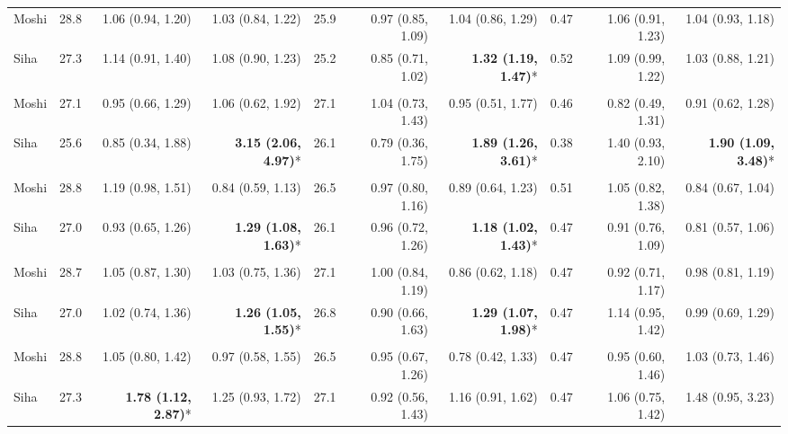 \begin{table}[t]
\begin{tabular*}{\linewidth}{@{\extracolsep{\fill}}l|rrrrrrrrr}
\midrule\addlinespace[2.5pt]
\multicolumn{10}{l}{Intestinal Worms} \\[2.5pt] 
\midrule\addlinespace[2.5pt]
Moshi & 28.8 & 1.06 (0.94, 1.20) & 1.03 (0.84, 1.22) & 25.9 & 0.97 (0.85, 1.09) & 1.04 (0.86, 1.29) & 0.47 & 1.06 (0.91, 1.23) & 1.04 (0.93, 1.18) \\ 
Siha & 27.3 & 1.14 (0.91, 1.40) & 1.08 (0.90, 1.23) & 25.2 & 0.85 (0.71, 1.02) & \textbf{1.32 (1.19, 1.47)}* & 0.52 & 1.09 (0.99, 1.22) & 1.03 (0.88, 1.21) \\ 
\midrule\addlinespace[2.5pt]
\multicolumn{10}{l}{Neoplasms/Cancer} \\[2.5pt] 
\midrule\addlinespace[2.5pt]
Moshi & 27.1 & 0.95 (0.66, 1.29) & 1.06 (0.62, 1.92) & 27.1 & 1.04 (0.73, 1.43) & 0.95 (0.51, 1.77) & 0.46 & 0.82 (0.49, 1.31) & 0.91 (0.62, 1.28) \\ 
Siha & 25.6 & 0.85 (0.34, 1.88) & \textbf{3.15 (2.06, 4.97)}* & 26.1 & 0.79 (0.36, 1.75) & \textbf{1.89 (1.26, 3.61)}* & 0.38 & 1.40 (0.93, 2.10) & \textbf{1.90 (1.09, 3.48)}* \\ 
\midrule\addlinespace[2.5pt]
\multicolumn{10}{l}{Other Cardiovascular Diseases} \\[2.5pt] 
\midrule\addlinespace[2.5pt]
Moshi & 28.8 & 1.19 (0.98, 1.51) & 0.84 (0.59, 1.13) & 26.5 & 0.97 (0.80, 1.16) & 0.89 (0.64, 1.23) & 0.51 & 1.05 (0.82, 1.38) & 0.84 (0.67, 1.04) \\ 
Siha & 27.0 & 0.93 (0.65, 1.26) & \textbf{1.29 (1.08, 1.63)}* & 26.1 & 0.96 (0.72, 1.26) & \textbf{1.18 (1.02, 1.43)}* & 0.47 & 0.91 (0.76, 1.09) & 0.81 (0.57, 1.06) \\ 
\midrule\addlinespace[2.5pt]
\multicolumn{10}{l}{Mild/Moderate Anemia} \\[2.5pt] 
\midrule\addlinespace[2.5pt]
Moshi & 28.7 & 1.05 (0.87, 1.30) & 1.03 (0.75, 1.36) & 27.1 & 1.00 (0.84, 1.19) & 0.86 (0.62, 1.18) & 0.47 & 0.92 (0.71, 1.17) & 0.98 (0.81, 1.19) \\ 
Siha & 27.0 & 1.02 (0.74, 1.36) & \textbf{1.26 (1.05, 1.55)}* & 26.8 & 0.90 (0.66, 1.63) & \textbf{1.29 (1.07, 1.98)}* & 0.47 & 1.14 (0.95, 1.42) & 0.99 (0.69, 1.29) \\ 
\midrule\addlinespace[2.5pt]
\multicolumn{10}{l}{Caries} \\[2.5pt] 
\midrule\addlinespace[2.5pt]
Moshi & 28.8 & 1.05 (0.80, 1.42) & 0.97 (0.58, 1.55) & 26.5 & 0.95 (0.67, 1.26) & 0.78 (0.42, 1.33) & 0.47 & 0.95 (0.60, 1.46) & 1.03 (0.73, 1.46) \\ 
Siha & 27.3 & \textbf{1.78 (1.12, 2.87)}* & 1.25 (0.93, 1.72) & 27.1 & 0.92 (0.56, 1.43) & 1.16 (0.91, 1.62) & 0.47 & 1.06 (0.75, 1.42) & 1.48 (0.95, 3.23) \\ 

\end{tabular*}
\end{table}
